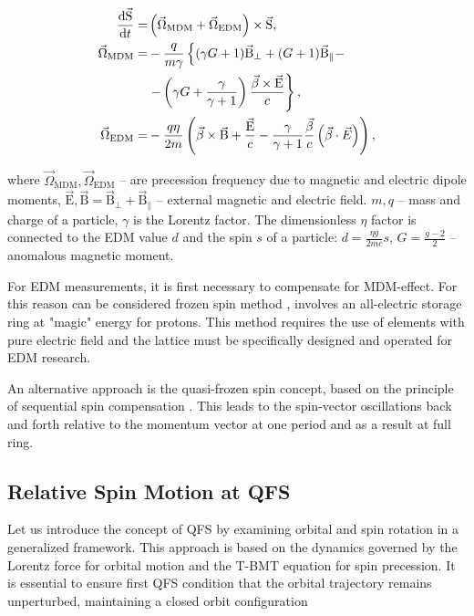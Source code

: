 \documentclass[a4paper,
               keeplastbox,   %
               ]{jacow}
\begin{document}
\begin{equation}
	\begin{aligned}
		\dv{\vec{\mathrm{S}}}{t} = & \left(\vec{\Omega}_{\text{MDM}}+\vec{\Omega}_{\text{EDM}}\right)\times\vec{\mathrm{S}}, \\
		\vec{\Omega}_{\text{MDM}}  = & - \frac{q}{m \gamma}\left\{(\gamma G+1) \vec{\mathrm{B}}_{\perp}+(G+1) \vec{\mathrm{B}}_{\|}-\right. \\
		& \left.-\left(\gamma G+\frac{\gamma}{\gamma+1}\right) \frac{\vec{\beta} \times \vec{\mathrm{E}}}{c}\right\}, \\
		\vec{\Omega}_{\text{EDM}}  = & - \frac{q \eta}{2 m}\left(\vec{\beta} \times \vec{\mathrm{B}}+\frac{\vec{\mathrm{E}}}{c}-\frac{\gamma}{\gamma+1}\frac{\vec{\beta}}{c}\left(\vec{\beta}\cdot\vec{E}\right)\right),
	\end{aligned}
	\label{eq:T-BMT}
\end{equation}

\noindent where $\vec{\Omega}_{\text{MDM}}, \vec{\Omega}_{\text{EDM}}$ -- are precession frequency due to magnetic and electric dipole moments, $\vec{\mathrm{E}}, \vec{\mathrm{B}} = \vec{\mathrm{B}}_{\perp} + \vec{\mathrm{B}}_{\|}$ -- external magnetic and electric field. $m, q$ -- mass and charge of a particle, $\gamma$ is the Lorentz factor. The dimensionless $\eta$ factor is connected to the EDM value $d$ and the spin $s$ of a particle: $d = \frac{\eta g}{2mc}s$, $G=\frac{g-2}{2}$ -- anomalous magnetic moment. 
\par For EDM measurements, it is first necessary to compensate for MDM-effect. For this reason can be considered frozen spin method \cite{BNL}, involves an all-electric storage ring at "magic" energy for protons. This method requires the use of elements with pure electric field and the lattice must be specifically designed and operated for EDM research.
\par An alternative approach is the quasi-frozen spin concept, based on the principle of sequential spin compensation \cite{QFS}. This leads to the spin-vector oscillations back and forth relative to the momentum vector at one period and as a result at full ring.

\subsection{Relative Spin Motion at QFS}    

\par Let us introduce the concept of QFS by examining orbital and spin rotation in a generalized framework. This approach is based on the dynamics governed by the Lorentz force for orbital motion and the T-BMT equation for spin precession. It is essential to ensure first QFS condition that the orbital trajectory remains unperturbed, maintaining a closed orbit configuration
\end{document}
